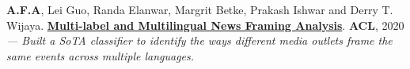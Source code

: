 \begin{zitemize}
\item \textbf{A.F.A}, Lei Guo, Randa Elanwar, Margrit Betke, Prakash Ishwar and Derry T. Wijaya. \textbf{\href{https://aclanthology.org/2020.acl-main.763/}{Multi-label and Multilingual News Framing Analysis}}. \textbf{ACL}, 2020
\vspace{0.3em}
\newline
\textit{--- Built a SoTA classifier to identify the ways different media outlets frame the same events across multiple languages.}
\end{zitemize}


